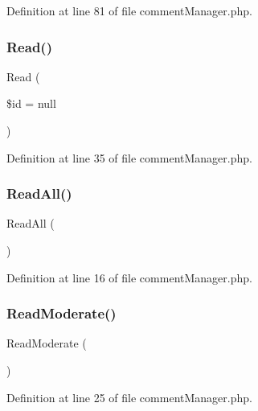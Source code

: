 Definition at line 81 of file comment\+Manager.\+php.

\mbox{\label{class_src_1_1_managers_1_1comment_manager_af0b2d518844625de0b1fe21ebb8e6c58}} 
\subsubsection{Read()}
{\footnotesize\ttfamily Read (\begin{DoxyParamCaption}\item[{}]{\$id = {\ttfamily null} }\end{DoxyParamCaption})}



Definition at line 35 of file comment\+Manager.\+php.

\mbox{\label{class_src_1_1_managers_1_1comment_manager_a24f9f6fa83eb8694eab0a87b2e6ad0b1}} 
\subsubsection{Read\+All()}
{\footnotesize\ttfamily Read\+All (\begin{DoxyParamCaption}{ }\end{DoxyParamCaption})}



Definition at line 16 of file comment\+Manager.\+php.

\mbox{\label{class_src_1_1_managers_1_1comment_manager_a4224d6d3de965c48624a2c530d0a2c94}} 
\subsubsection{Read\+Moderate()}
{\footnotesize\ttfamily Read\+Moderate (\begin{DoxyParamCaption}{ }\end{DoxyParamCaption})}



Definition at line 25 of file comment\+Manager.\+php.



